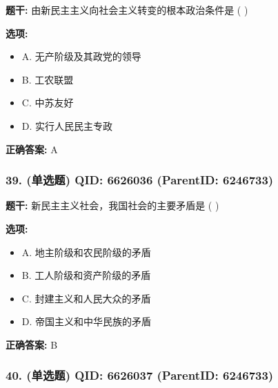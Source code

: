 \documentclass[12pt,UTF8]{ctexart}
\begin{document}
\textbf{题干:}
由新民主主义向社会主义转变的根本政治条件是  ( )



\textbf{选项:}
\begin{itemize}[leftmargin=*]

  \item A. 无产阶级及其政党的领导

  \item B. 工农联盟

  \item C. 中苏友好

  \item D. 实行人民民主专政

\end{itemize}

\textbf{正确答案:}
A

\vspace{0.3em}\hrulefill\vspace{0.7em}

\subsubsection*{39. (单选题) \small QID: 6626036 (ParentID: 6246733)}

\textbf{题干:}
新民主主义社会，我国社会的主要矛盾是  ( )



\textbf{选项:}
\begin{itemize}[leftmargin=*]

  \item A. 地主阶级和农民阶级的矛盾

  \item B. 工人阶级和资产阶级的矛盾

  \item C. 封建主义和人民大众的矛盾

  \item D. 帝国主义和中华民族的矛盾

\end{itemize}

\textbf{正确答案:}
B

\vspace{0.3em}\hrulefill\vspace{0.7em}

\subsubsection*{40. (单选题) \small QID: 6626037 (ParentID: 6246733)}
\end{document}
